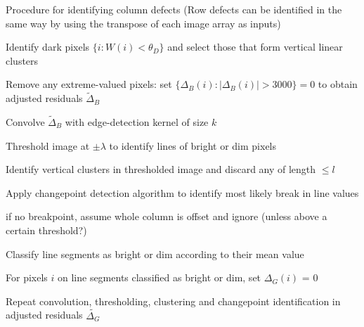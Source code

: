 \documentclass[\main/IO-Pixels.tex]{subfiles}
\begin{document}
\begin{algorithm}
    \caption{Procedure for identifying column defects (Row defects can be identified in the same way by using the transpose of each image array as inputs)}
	\label{proc:lines}



Identify dark pixels $\{ i: W(i) < \theta_D \}$ and select those that form vertical linear clusters

Remove any extreme-valued pixels: set $\{ \Delta_B (i) : |\Delta_B(i)| > 3000 \} = 0$ to obtain adjusted residuals $\tilde{\Delta}_B$ 

Convolve $\tilde{\Delta}_B$ with edge-detection kernel of size $k$

Threshold image at $\pm \lambda$ to identify lines of bright or dim pixels

Identify vertical clusters in thresholded image and discard any of length $\le l$

Apply changepoint detection algorithm to identify most likely break in line values

if no breakpoint, assume whole column is offset and ignore (unless above a certain threshold?)

Classify line segments as bright or dim according to their mean value

For pixels $i$ on line segments classified as bright or dim, set $\Delta_G(i)$ = 0

Repeat convolution, thresholding, clustering and changepoint identification in adjusted residuals $\tilde{\Delta_G}$

\end{algorithm}

\end{document}
